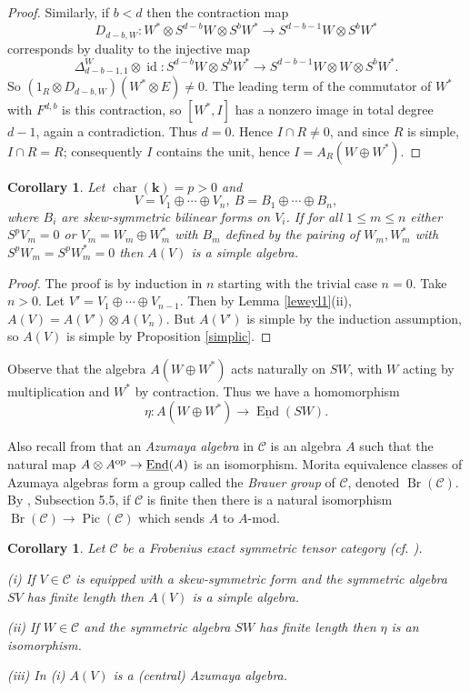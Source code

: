 \documentclass[12pt]{amsart}
\numberwithin{equation}{section}
\providecommand{\k}{}\renewcommand{\k}{\mathbf{k}}
\providecommand{\C}{}\renewcommand{\C}{\mathcal{C}}
\providecommand{\id}{}\renewcommand{\id}{\operatorname{id}}
\providecommand{\End}{}\renewcommand{\End}{\operatorname{End}}
\providecommand{\Pic}{}\renewcommand{\Pic}{\operatorname{Pic}}
\providecommand{\Br}{}\renewcommand{\Br}{\operatorname{Br}}
\theoremstyle{plain}
\newtheorem{corollary}[theorem]{Corollary}
\theoremstyle{definition}
\theoremstyle{remark}
\begin{document}
\begin{proof}
Similarly, if $b<d$ then the contraction map  
$$
D_{d-b,W}: W^*\otimes S^{d-b}W\otimes S^bW^*\to S^{d-b-1}W\otimes S^bW^*
$$ 
corresponds by duality to the injective map 
$$
\Delta_{d-b-1,1}^W\otimes \id: S^{d-b}W\otimes S^bW^*\to S^{d-b-1}W\otimes W\otimes S^bW^*.
$$ 
So $(1_R\otimes D_{d-b,W})(W^*\otimes E)\ne 0$. 
The leading term of the commutator of $W^*$ with $F^{d,b}$ is this contraction, so $[W^*,I]$ has a nonzero image in total degree $d-1$, again a contradiction. Thus $d=0$. Hence $I\cap R\ne 0$, and since $R$ is simple, $I\cap R=R$; consequently $I$ contains the unit, hence $I=A_R(W\oplus W^*)$.
\end{proof} 

\begin{corollary}\label{simplic1} Let $\operatorname{char}(\k)=p>0$ and 
$$
V=V_1\oplus\cdots\oplus V_n,\ B=B_1\oplus\cdots\oplus B_n,
$$ 
where $B_i$ are skew-symmetric bilinear forms on $V_i$. If for all $1\le m\le n$ either $S^pV_m=0$ or $V_m=W_m\oplus W_m^*$ with $B_m$ defined by the pairing of $W_m,W_m^*$ with $S^pW_m=S^pW_m^*=0$ then $A(V)$ is a simple algebra. 
\end{corollary} 

\begin{proof} The proof is by induction in $n$ starting with the trivial case $n=0$. Take $n>0$. Let $V'=V_1\oplus\cdots\oplus V_{n-1}$. Then by Lemma \ref{leweyl1}(ii), $A(V)=A(V')\otimes A(V_n)$. But $A(V')$ is simple by the induction assumption, so $A(V)$ is simple by Proposition \ref{simplic}. 
\end{proof} 

Observe that the algebra $A(W\oplus W^*)$ acts naturally on $SW$, with $W$ acting by multiplication and 
$W^*$ by contraction. Thus we have a homomorphism 
$$
\eta: A(W\oplus W^*)\to \underline{\End}(SW).
$$ 

Also recall from \cite{OZ} that an {\it Azumaya algebra} in $\C$ is an algebra $A$ such that 
the natural map $A\otimes A^{\rm op}\to \underline{\End}(A)$ is an isomorphism. Morita equivalence classes of 
Azumaya algebras form a group called the {\it Brauer group} of $\C$, denoted $\Br(\C)$. By \cite{DN}, Subsection 5.5, 
if $\C$ is finite then there is a natural isomorphism $\Br(\C)\to \Pic(\C)$ which sends $A$ to $A$-mod. 

\begin{corollary}\label{simplic2} Let $\C$ be a Frobenius exact symmetric tensor category (cf. \cite{CEO}).

(i) If $V\in \C$ is equipped with a skew-symmetric form and the symmetric algebra $SV$ has finite length then $A(V)$ is a simple algebra.

(ii) If $W\in \C$ and the symmetric algebra $SW$ has finite length then $\eta$ is an isomorphism.

(iii) In (i) $A(V)$ is a (central) Azumaya algebra. 
\end{corollary}
\end{document}
